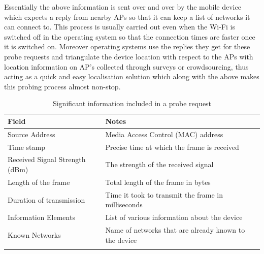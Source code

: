 Essentially the above information is sent over and over by the mobile device which expects a reply from nearby APs so that it can keep a list of networks it can connect to.
This process is usually carried out even when the Wi-Fi is switched off in the operating system so that the connection times are faster once it is switched on.
Moreover operating systems use the replies they get for these probe requests and triangulate the device location with respect to the APs with location information on AP's collected through surveys or crowdsourcing, thus acting as a quick and easy localisation solution which along with the above makes this probing process almost non-stop. 

\begin{table}
  \footnotesize
  \begin{center}
    \begin{tabular}{lp{6.5cm}}
      \toprule
        Field & Notes\\
      \midrule
        \addlinespace[0.2cm]
        Source Address & Media Access Control (MAC) address\\
        \addlinespace[0.2cm]
        Time stamp & Precise time at which the frame is received\\
        \addlinespace[0.2cm]
        Received Signal Strength (dBm) & The strength of the received signal\\
        \addlinespace[0.2cm]
        Length of the frame & Total length of the frame in bytes\\
        \addlinespace[0.2cm]
        Duration of transmission & Time it took to transmit the frame in milliseconds\\
        \addlinespace[0.2cm]
        Information Elements & List of various information about the device\\
        \addlinespace[0.2cm]
        Known Networks & Name of networks that are already known to the device\\
        \addlinespace[0.1cm]
      \bottomrule
    \end{tabular}
  \end{center}
  \caption{Significant information included in a probe request}
  \label{table:collection:proberequest}
\end{table}



